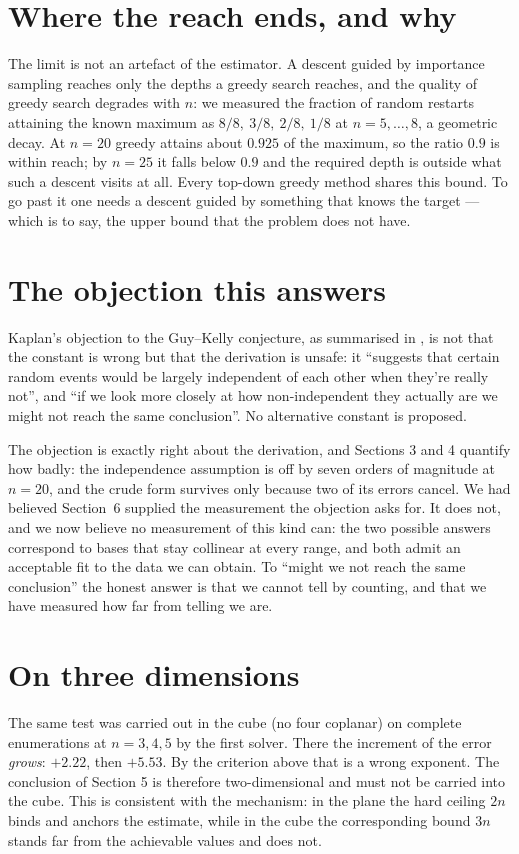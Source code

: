 \documentclass[11pt,a4paper]{article}
\begin{document}
\section{Where the reach ends, and why}
The limit is not an artefact of the estimator.  A descent guided by importance sampling reaches
only the depths a greedy search reaches, and the quality of greedy search degrades with $n$: we
measured the fraction of random restarts attaining the known maximum as $8/8,\ 3/8,\ 2/8,\ 1/8$
at $n=5,\dots,8$, a geometric decay.  At $n=20$ greedy attains about $0.925$ of the maximum, so
the ratio $0.9$ is within reach; by $n=25$ it falls below $0.9$ and the required depth is outside
what such a descent visits at all.  Every top-down greedy method shares this bound.  To go past it
one needs a descent guided by something that knows the target --- which is to say, the upper bound
that the problem does not have.

\section{The objection this answers}
Kaplan's objection to the Guy--Kelly conjecture, as summarised in \cite{Kaplan}, is not that the
constant is wrong but that the derivation is unsafe: it ``suggests that certain random events would
be largely independent of each other when they're really not'', and ``if we look more closely at
how non-independent they actually are we might not reach the same conclusion''.  No alternative
constant is proposed.

The objection is exactly right about the derivation, and Sections 3 and 4 quantify how badly:
the independence assumption is off by seven orders of magnitude at $n=20$, and the crude form
survives only because two of its errors cancel.  We had believed Section~6 supplied the
measurement the objection asks for.  It does not, and we now believe no measurement of this kind
can: the two possible answers correspond to bases that stay collinear at every range, and both
admit an acceptable fit to the data we can obtain.  To ``might we not reach the same conclusion''
the honest answer is that we cannot tell by counting, and that we have measured how far from
telling we are.

\section{On three dimensions}
The same test was carried out in the cube (no four coplanar) on complete enumerations at
$n=3,4,5$ by the first solver.  There the increment of the error \emph{grows}: $+2.22$, then
$+5.53$.  By the criterion above that is a wrong exponent.  The conclusion of Section 5 is
therefore two-dimensional and must not be carried into the cube.  This is consistent with the
mechanism: in the plane the hard ceiling $2n$ binds and anchors the estimate, while in the cube the
corresponding bound $3n$ stands far from the achievable values and does not.
\end{document}

